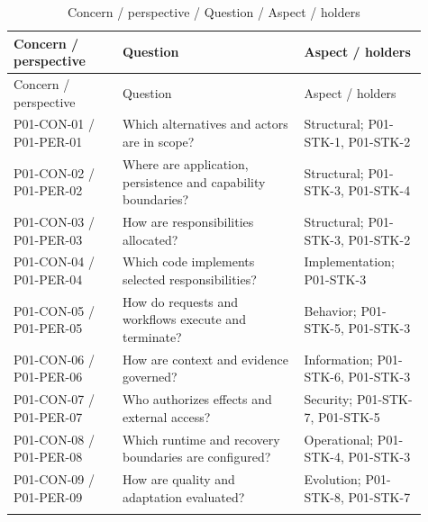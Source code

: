 \documentclass[10pt,letterpaper]{article}
\begin{document}
\begin{longtable}{@{}>{\raggedright\arraybackslash}p{0.24\linewidth}>{\raggedright\arraybackslash}p{0.4\linewidth}>{\raggedright\arraybackslash}p{0.27\linewidth}@{}}
\caption{Concern / perspective / Question / Aspect / holders}\\
\toprule Concern / perspective & Question & Aspect / holders\\\midrule\endfirsthead
\toprule Concern / perspective & Question & Aspect / holders\\\midrule\endhead
P01-CON-01 / P01-PER-01 & Which alternatives and actors are in scope? & Structural; P01-STK-1, P01-STK-2\\\addlinespace
P01-CON-02 / P01-PER-02 & Where are application, persistence and capability boundaries? & Structural; P01-STK-3, P01-STK-4\\\addlinespace
P01-CON-03 / P01-PER-03 & How are responsibilities allocated? & Structural; P01-STK-3, P01-STK-2\\\addlinespace
P01-CON-04 / P01-PER-04 & Which code implements selected responsibilities? & Implementation; P01-STK-3\\\addlinespace
P01-CON-05 / P01-PER-05 & How do requests and workflows execute and terminate? & Behavior; P01-STK-5, P01-STK-3\\\addlinespace
P01-CON-06 / P01-PER-06 & How are context and evidence governed? & Information; P01-STK-6, P01-STK-3\\\addlinespace
P01-CON-07 / P01-PER-07 & Who authorizes effects and external access? & Security; P01-STK-7, P01-STK-5\\\addlinespace
P01-CON-08 / P01-PER-08 & Which runtime and recovery boundaries are configured? & Operational; P01-STK-4, P01-STK-3\\\addlinespace
P01-CON-09 / P01-PER-09 & How are quality and adaptation evaluated? & Evolution; P01-STK-8, P01-STK-7\\\addlinespace
\bottomrule\end{longtable}
\end{document}
